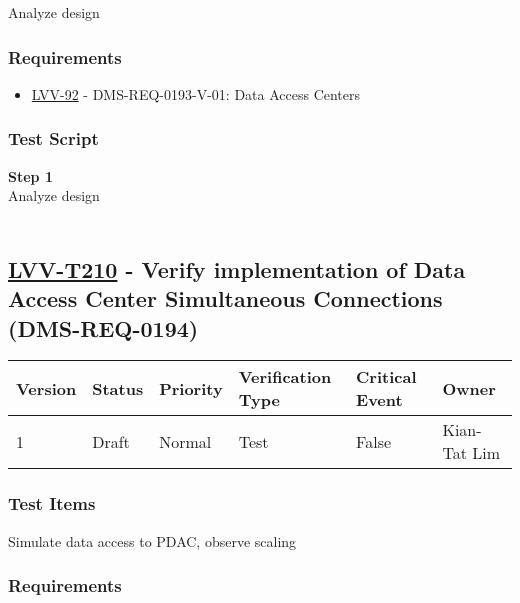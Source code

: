 Analyze design

\hypertarget{requirements-109}{%
\subsubsection{Requirements}\label{requirements-109}}

\begin{itemize}
\tightlist
\item
  \href{https://jira.lsstcorp.org/browse/LVV-92}{LVV-92} -
  DMS-REQ-0193-V-01: Data Access Centers
\end{itemize}

\hypertarget{test-script-109}{%
\subsubsection{Test Script}\label{test-script-109}}

\textbf{Step 1}\\
Analyze design\\
~\\

\hypertarget{lvv-t210---verify-implementation-of-data-access-center-simultaneous-connections-dms-req-0194}{%
\subsection{\texorpdfstring{\href{https://jira.lsstcorp.org/secure/Tests.jspa\#/testCase/LVV-T210}{LVV-T210}
- Verify implementation of Data Access Center Simultaneous Connections
(DMS-REQ-0194)}{LVV-T210 - Verify implementation of Data Access Center Simultaneous Connections (DMS-REQ-0194)}}\label{lvv-t210---verify-implementation-of-data-access-center-simultaneous-connections-dms-req-0194}}

\begin{longtable}[]{@{}llllll@{}}
\toprule
Version & Status & Priority & Verification Type & Critical Event &
Owner\tabularnewline
\midrule
\endhead
1 & Draft & Normal & Test & False & Kian-Tat Lim\tabularnewline
\bottomrule
\end{longtable}

\hypertarget{test-items-110}{%
\subsubsection{Test Items}\label{test-items-110}}

Simulate data access to PDAC, observe scaling

\hypertarget{requirements-110}{%
\subsubsection{Requirements}\label{requirements-110}}

